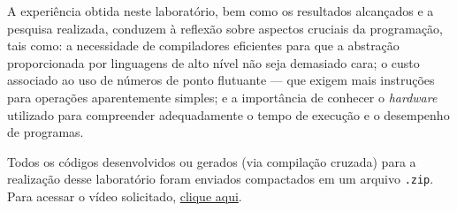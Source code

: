\documentclass[a4paper,12pt]{article}
\newcommand{\cod}[1]{\texttt{#1}}
\begin{document}
A experiência obtida neste laboratório, bem como os resultados alcançados e a pesquisa realizada, conduzem à reflexão sobre aspectos cruciais da programação, tais como: a necessidade de compiladores eficientes para que a abstração proporcionada por linguagens de alto nível não seja demasiado cara; o custo associado ao uso de números de ponto flutuante — que exigem mais instruções para operações aparentemente simples; e a importância de conhecer o \textit{hardware} utilizado para compreender adequadamente o tempo de execução e o desempenho de programas.

Todos os códigos desenvolvidos ou gerados (via compilação cruzada) para a realização desse laboratório foram enviados compactados em um arquivo \cod{.zip}. Para acessar o vídeo solicitado, \href{https://www.youtube.com/watch?v=0igjcjJHzPU}{\textcolor{azul_link}{clique aqui}}.
\end{document}
